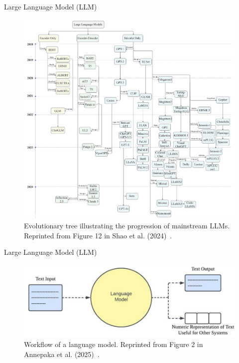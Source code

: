 \documentclass[12pt]{beamer}
\begin{document}
\begin{frame}[allowframebreaks]{Large Language Model (LLM)}
    \begin{figure}
        \centering
        \includegraphics[height=0.6\textheight]{figures/llm_evolution.png}
        \caption{Evolutionary tree illustrating the progression of mainstream LLMs. Reprinted from Figure 12 in Shao et al. (2024)~\cite{10720163}.}
        \label{fig:Fig. 5}
    \end{figure}
\end{frame}

\begin{frame}[allowframebreaks]{Large Language Model (LLM)}
    \begin{figure}
        \centering
        \includegraphics[width=0.9\linewidth]{figures/lm_workflow.png}
        \caption{Workflow of a language model. Reprinted from Figure 2 in Annepaka et al. (2025)~\cite{Annepaka2025}.}
        \label{fig:Fig. 6}
    \end{figure}
\end{frame} 
\end{document}
